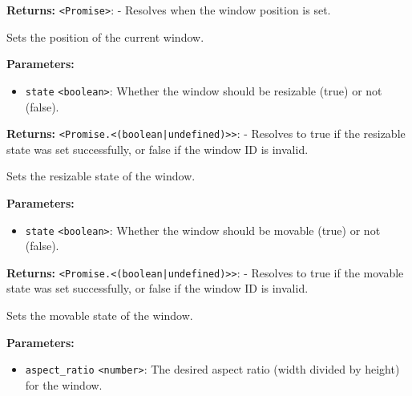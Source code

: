 \documentclass[12pt,a4paper]{article}
\begin{document}
\noindent \textbf{Returns:} \texttt{<Promise>}: - Resolves when the window position is set.

\noindent Sets the position of the current window.

\vspace{5mm}
\noindent {}


\noindent \textbf{Parameters:}
\begin{itemize}
  \item \texttt{state} \texttt{<boolean>}: Whether the window should be resizable (\textasciigrave{}true\textasciigrave{}) or not (\textasciigrave{}false\textasciigrave{}).
\end{itemize}

\noindent \textbf{Returns:} \texttt{<Promise.<(boolean|undefined)>>}: - Resolves to \textasciigrave{}true\textasciigrave{} if the resizable state was set successfully, or \textasciigrave{}false\textasciigrave{} if the window ID is invalid.

\noindent Sets the resizable state of the window.

\vspace{5mm}
\noindent {}


\noindent \textbf{Parameters:}
\begin{itemize}
  \item \texttt{state} \texttt{<boolean>}: Whether the window should be movable (\textasciigrave{}true\textasciigrave{}) or not (\textasciigrave{}false\textasciigrave{}).
\end{itemize}

\noindent \textbf{Returns:} \texttt{<Promise.<(boolean|undefined)>>}: - Resolves to \textasciigrave{}true\textasciigrave{} if the movable state was set successfully, or \textasciigrave{}false\textasciigrave{} if the window ID is invalid.

\noindent Sets the movable state of the window.

\vspace{5mm}
\noindent {}


\noindent \textbf{Parameters:}
\begin{itemize}
  \item \texttt{aspect\_ratio} \texttt{<number>}: The desired aspect ratio (width divided by height) for the window.
\end{itemize}
\end{document}
